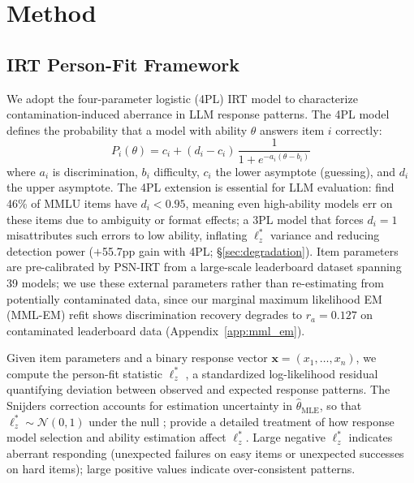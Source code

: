\section{Method}
\label{sec:method}

\subsection{IRT Person-Fit Framework}
\label{sec:framework}

We adopt the four-parameter logistic (4PL) IRT model to characterize contamination-induced aberrance in LLM response patterns.
The 4PL model defines the probability that a model with ability $\theta$ answers item $i$ correctly:
\begin{equation}
  P_i(\theta) = c_i + (d_i - c_i)\,\frac{1}{1 + e^{-a_i(\theta - b_i)}}
  \label{eq:4pl}
\end{equation}
where $a_i$ is discrimination, $b_i$ difficulty, $c_i$ the lower asymptote (guessing), and $d_i$ the upper asymptote.
The 4PL extension is essential for LLM evaluation: \citet{psnirt2026} find 46\% of MMLU items have $d_i < 0.95$, meaning even high-ability models err on these items due to ambiguity or format effects; a 3PL model that forces $d_i{=}1$ misattributes such errors to low ability, inflating $\ell_z^*$ variance and reducing detection power ($+$55.7pp gain with 4PL; \S\ref{sec:degradation}).
Item parameters are pre-calibrated by PSN-IRT \citep{psnirt2026} from a large-scale leaderboard dataset spanning 39 models; we use these external parameters rather than re-estimating from potentially contaminated data, since our marginal maximum likelihood EM (MML-EM) refit shows discrimination recovery degrades to $r_a{=}0.127$ on contaminated leaderboard data (Appendix~\ref{app:mml_em}).

Given item parameters and a binary response vector $\mathbf{x} = (x_1, \ldots, x_n)$, we compute the person-fit statistic $\ell_z^*$ \citep{snijders2001}, a standardized log-likelihood residual quantifying deviation between observed and expected response patterns.
The Snijders correction accounts for estimation uncertainty in $\hat{\theta}_{\text{MLE}}$, so that $\ell_z^* \sim \mathcal{N}(0,1)$ under the null \citep{drasgow1985, snijders2001}; \citet{magis2012} provide a detailed treatment of how response model selection and ability estimation affect $\ell_z^*$.
Large negative $\ell_z^*$ indicates aberrant responding (unexpected failures on easy items or unexpected successes on hard items); large positive values indicate over-consistent patterns.

